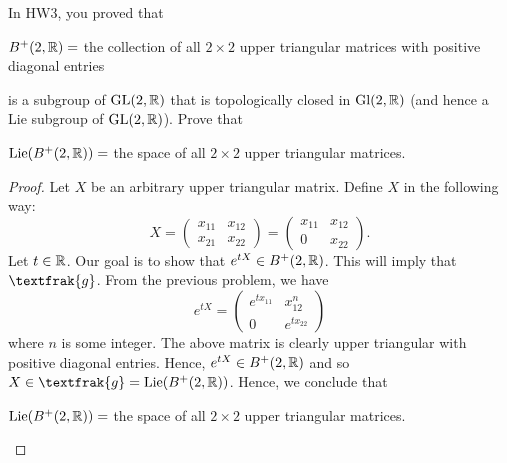 \documentclass{article}
\begin{document}
\begin{problem}
    In HW3, you proved that 
    \begin{center}
        \( B^{+}(2,\mathbb{R}) =  \) the collection of all \( 2 \times 2  \) upper triangular matrices with positive diagonal entries
    \end{center}
    is a subgroup of \( \text{GL}(2,\mathbb{R})    \) that is topologically closed in \( \text{Gl}(2,\mathbb{R})  \) (and hence a Lie subgroup of \( \text{GL}(2,\mathbb{R})  \)). Prove that 
    \begin{center}
        \( \text{Lie}(B^{+}(2,\mathbb{R})) =   \) the space of all \( 2 \times 2  \) upper triangular matrices. 
    \end{center}
\end{problem}
\begin{proof}
Let \( X  \) be an arbitrary upper triangular matrix. Define \( X  \) in the following way:
\[  X = \begin{pmatrix} {x}_{11} & {x}_{12} \\ {x}_{21} & {x}_{22} \end{pmatrix} = \begin{pmatrix} {x}_{11} & {x}_{12} \\ 0 & {x}_{22} \end{pmatrix}. \]
Let \( t \in \mathbb{R}  \). Our goal is to show that \( e^{tX} \in B^{+}(2,\mathbb{R}) \). This will imply that \( \textfrak{g} \). From the previous problem, we have 
\[  e^{tX} = \begin{pmatrix} e^{t {x}_{11}} & {x}_{12}^{n} \\ 0 & e^{t {x}_{22}}  \end{pmatrix}  \]
where \( n  \) is some integer. The above matrix is clearly upper triangular with positive diagonal entries. Hence, \( e^{tX}  \in B^{+}(2,\mathbb{R}) \) and so \( X \in \textfrak{g} = \text{Lie}(B^{+}(2,\R))  \). Hence, we conclude that 
\begin{center}
    \( \text{Lie}(B^{+}(2,\mathbb{R})) =   \) the space of all \( 2 \times 2  \) upper triangular matrices.
\end{center}
\end{proof}
\end{document}
